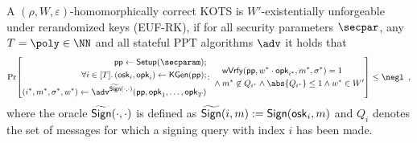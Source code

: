\begin{definition}
  A $(\rho,W,\varepsilon)$-homomorphically correct KOTS is $W'$-existentially unforgeable under rerandomized keys (EUF-RK), if for all security parameters $\secpar$, any $T=\poly\in\NN$ and all stateful PPT algorithms $\adv$ it holds that
  \[
    \Pr\mleft[
      \begin{aligned}
      \params \gets \setup(\secparam);\\
      \forall i \in [T]\ldotp (\osk_i,\opk_i) \gets \kgen(\params);\\
      (i^*,m^*,\sigma^*,w^*) \gets \adv^{\widetilde\sign(\cdot,\cdot)}(\params,\opk_1,\dots,\opk_{T})\\
      \end{aligned}\colon
      \begin{aligned}
      &\wverify(\params,w^*\cdot\opk_{i^*},m^*,\sigma^*) = 1\\
      {}\land{}& m^*\not\in Q_{i^*} \land \abs{Q_{i^*}}\leq 1 \land w^* \in W'
      \end{aligned}
    \mright]\leq \negl\enspace,
  \]
  where the oracle $\widetilde{\mathsf{Sign}}(\cdot,\cdot)$ is defined as $\widetilde{\mathsf{Sign}}(i,m) := \mathsf{Sign}(\mathsf{osk}_i,m)$ and $Q_i$ denotes the set of messages for which a signing query with index $i$ has been made.
\end{definition}

